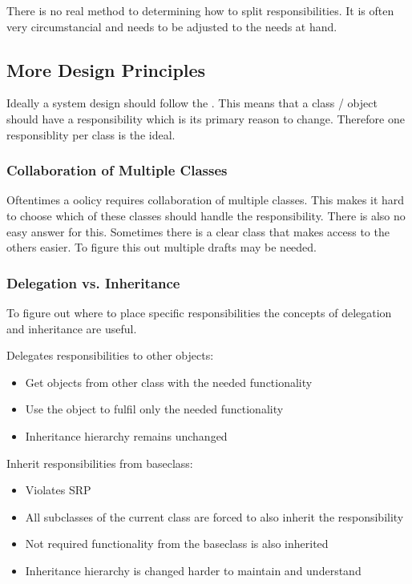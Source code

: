 \documentclass[
../../Software_Engineering_Summary.tex,
]
{subfiles}
\begin{document}
There is no real method to determining how to split responsibilities. It is often very circumstancial and needs to be adjusted to the needs at hand.

\subsection{More Design Principles}
Ideally a system design should follow the . This means that a class / object should have a responsibility which is its primary reason to change. Therefore one responsiblity per class is the ideal.

\subsubsection{Collaboration of Multiple Classes}
Oftentimes a oolicy requires collaboration of multiple classes. This makes it hard to choose which of these classes should handle the responsibility. There is also no easy answer for this. Sometimes there is a clear class that makes access to the others easier. To figure this out multiple drafts may be needed.

\subsubsection{Delegation vs. Inheritance}
To figure out where to place specific responsibilities the concepts of delegation and inheritance are useful. 

\begin{defbox}
    [Delegation]
    Delegates responsibilities to other objects:
    \begin{itemize}
        \item Get objects from other class with the needed functionality
        \item Use the object to fulfil only the needed functionality
        \item Inheritance hierarchy remains unchanged
    \end{itemize}
\end{defbox}

\begin{defbox}
    [Inheritance]
    Inherit responsibilities from baseclass:
    \begin{itemize}
        \item Violates SRP
        \item All subclasses of the current class are forced to also inherit the responsibility
        \item Not required functionality from the baseclass is also inherited
        \item Inheritance hierarchy is changed \rightarrow harder to maintain and understand
    \end{itemize}
\end{defbox}
\end{document}
